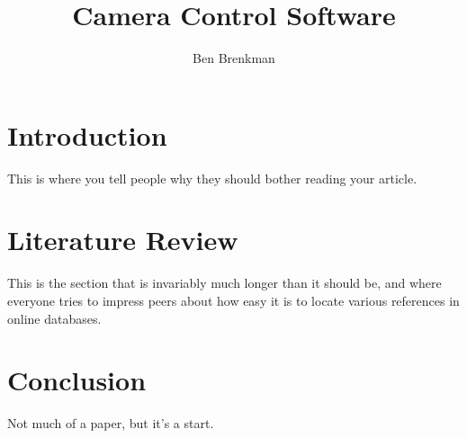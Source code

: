 \documentclass[titlepage]{article}
\title{Camera Control Software}
\author{Ben Brenkman}
\begin{document}
\maketitle

\section{Introduction}
This is where you tell people why they should bother reading your article.

\section{Literature Review}
This is the section that is invariably much longer than it should be, and
where everyone tries to impress peers about how easy it is to locate various
references in online databases.

\section{Conclusion}
Not much of a paper, but it's a start.
\end{document}
